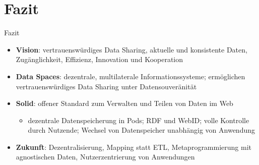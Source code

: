 
\section{Fazit}

\begin{frame}{Fazit}
    \begin{itemize}
        \item \textbf{Vision}: vertrauenswürdiges Data Sharing, aktuelle und konsistente Daten, Zugänglichkeit, Effizienz, Innovation und Kooperation
        
        \pause
        \item \textbf{Data Spaces}: dezentrale, multilaterale Informationssysteme; ermöglichen vertrauenswürdiges Data Sharing unter Datensouveränität
        
        \pause
        \item \textbf{Solid}: offener Standard zum Verwalten und Teilen von Daten im Web
        
        \pause
        \begin{itemize}
            \item dezentrale Datenspeicherung in Pods; RDF und WebID; volle Kontrolle durch Nutzende; Wechsel von Datenspeicher unabhängig von Anwendung
        \end{itemize}
        
        \pause
        \item \textbf{Zukunft}: Dezentralisierung, Mapping statt ETL, Metaprogrammierung mit agnostischen Daten, Nutzerzentrierung von Anwendungen
    \end{itemize}
\end{frame}
